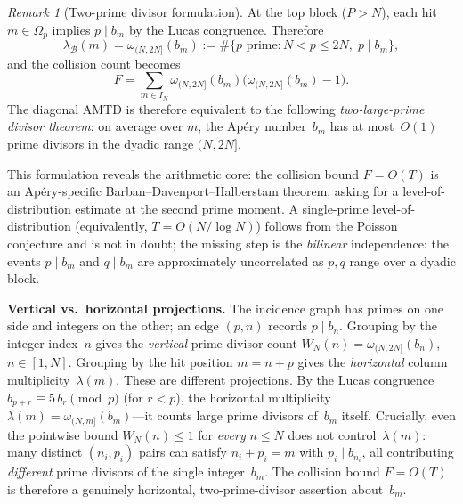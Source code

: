 \documentclass[11pt]{article}
\theoremstyle{definition}
\theoremstyle{remark}
\newtheorem{remark}[theorem]{Remark}
\begin{document}
\begin{remark}[Two-prime divisor formulation]
\label{rem:two-prime}
At the top block ($P > N$), each hit $m \in \Omega_p$
implies $p \mid b_m$ by the Lucas congruence.
Therefore
\[
  \lambda_{\mathcal{B}}(m)
  = \omega_{(N,2N]}(b_m)
  := \#\{p \text{ prime} : N < p \le 2N,\; p \mid b_m\},
\]
and the collision count becomes
\[
  F
  = \sum_{m \in I_N}
  \omega_{(N,2N]}(b_m)\bigl(\omega_{(N,2N]}(b_m) - 1\bigr).
\]
The diagonal AMTD is therefore equivalent to
the following \emph{two-large-prime divisor theorem}:
on average over $m$, the Ap\'ery number~$b_m$
has at most~$O(1)$ prime divisors in the
dyadic range $(N, 2N]$.

This formulation reveals the arithmetic core:
the collision bound $F = O(T)$ is an
Ap\'ery-specific Barban--Davenport--Halberstam
theorem, asking for a level-of-distribution
estimate at the second prime moment.
A single-prime level-of-distribution
(equivalently, $T = O(N/\log N)$)
follows from the Poisson conjecture and
is not in doubt; the missing step is
the \emph{bilinear} independence:
the events $p \mid b_m$ and $q \mid b_m$
are approximately uncorrelated as
$p, q$ range over a dyadic block.

\medskip
\noindent\textbf{Vertical vs.\ horizontal projections.}
The incidence graph has primes on one side
and integers on the other; an edge
$(p, n)$ records $p \mid b_n$.
Grouping by the integer index~$n$ gives
the \emph{vertical} prime-divisor count
$W_N(n) = \omega_{(N,2N]}(b_n)$,
$n \in [1, N]$.
Grouping by the hit position
$m = n + p$ gives the
\emph{horizontal} column multiplicity~$\lambda(m)$.
These are different projections.
By the Lucas congruence
$b_{p+r} \equiv 5\,b_r\pmod{p}$
(for $r < p$), the horizontal multiplicity
$\lambda(m) = \omega_{(N,m]}(b_m)$---it
counts large prime divisors of~$b_m$ itself.
Crucially, even the pointwise bound
$W_N(n) \le 1$ for \emph{every} $n \le N$
does not control~$\lambda(m)$:
many distinct $(n_i, p_i)$ pairs can satisfy
$n_i + p_i = m$ with $p_i \mid b_{n_i}$,
all contributing \emph{different} prime
divisors of the single integer~$b_m$.
The collision bound $F = O(T)$ is
therefore a genuinely horizontal,
two-prime-divisor assertion about~$b_m$.
\end{remark}
\end{document}
